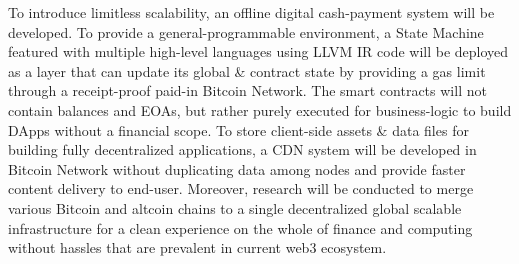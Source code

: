 \documentclass[a4paper,	10pt]{extarticle}
\begin{document}
To introduce limitless scalability, an offline digital cash-payment system will be developed. To provide a general-programmable environment, a State Machine \cite{wood2014ethereum} featured with multiple high-level languages using LLVM \cite{llvm} IR code will be deployed as a layer that can update its global \& contract state by providing a gas limit through a receipt-proof paid-in Bitcoin Network. The smart contracts will not contain balances and EOAs, but rather purely executed for business-logic to build DApps without a financial scope. To store client-side assets \& data files for building fully decentralized applications, a CDN system will be developed in Bitcoin Network without duplicating data among nodes and provide faster content delivery to end-user. Moreover, research will be conducted to merge various Bitcoin and altcoin chains to a single decentralized global scalable infrastructure for a clean experience on the whole of finance and computing without hassles that are prevalent in current web3 ecosystem.




\end{document}
